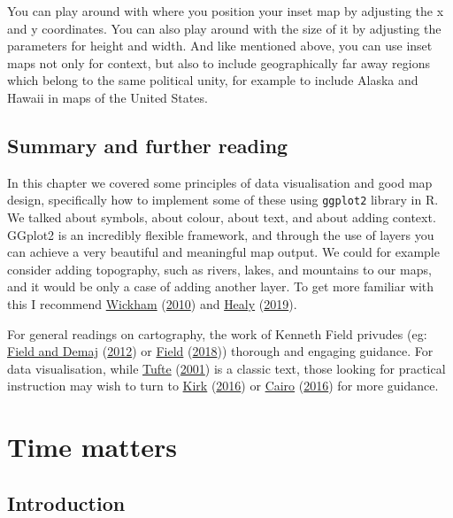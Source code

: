 \documentclass[
  krantz2]{krantz}
\begin{document}
You can play around with where you position your inset map by adjusting the x and y coordinates. You can also play around with the size of it by adjusting the parameters for height and width. And like mentioned above, you can use inset maps not only for context, but also to include geographically far away regions which belong to the same political unity, for example to include Alaska and Hawaii in maps of the United States.

\hypertarget{summary-and-further-reading-4}{%
\section{Summary and further reading}\label{summary-and-further-reading-4}}

In this chapter we covered some principles of data visualisation and good map design, specifically how to implement some of these using \texttt{ggplot2} library in R. We talked about symbols, about colour, about text, and about adding context. GGplot2 is an incredibly flexible framework, and through the use of layers you can achieve a very beautiful and meaningful map output. We could for example consider adding topography, such as rivers, lakes, and mountains to our maps, and it would be only a case of adding another layer. To get more familiar with this I recommend \protect\hyperlink{ref-Wickham_2010}{Wickham} (\protect\hyperlink{ref-Wickham_2010}{2010}) and \protect\hyperlink{ref-Healy_2019}{Healy} (\protect\hyperlink{ref-Healy_2019}{2019}).

For general readings on cartography, the work of Kenneth Field privudes (eg: \protect\hyperlink{ref-Field_2012}{Field and Demaj} (\protect\hyperlink{ref-Field_2012}{2012}) or \protect\hyperlink{ref-Field_2018}{Field} (\protect\hyperlink{ref-Field_2018}{2018})) thorough and engaging guidance. For data visualisation, while \protect\hyperlink{ref-Tufte_2001}{Tufte} (\protect\hyperlink{ref-Tufte_2001}{2001}) is a classic text, those looking for practical instruction may wish to turn to \protect\hyperlink{ref-Kirk_2016}{Kirk} (\protect\hyperlink{ref-Kirk_2016}{2016}) or \protect\hyperlink{ref-Cairo_2016}{Cairo} (\protect\hyperlink{ref-Cairo_2016}{2016}) for more guidance.

\hypertarget{time-matters}{%
\chapter{Time matters}\label{time-matters}}

\hypertarget{introduction-5}{%
\section{Introduction}\label{introduction-5}}
\end{document}
